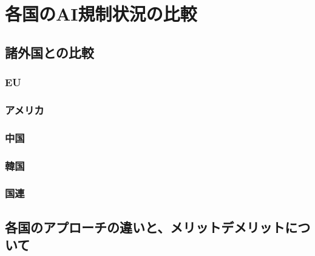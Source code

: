 \chapter{各国のAI規制状況の比較}

\section{諸外国との比較}

\subsection{EU}

\subsection{アメリカ}

\subsection{中国}

\subsection{韓国}

\subsection{国連}

\section{各国のアプローチの違いと、メリットデメリットについて}
